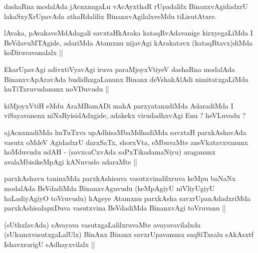 \begin{artha}
dashaRna modalAda jAcnxnagaLu vAcAyxthaR rUpadalilx BinanxvAgidadxrU
lakaSxyXrUpavAda athaRdalilix BinanxvAgilalxveMdu tiLisutAtxre.
\end{artha}

\begin{artha}
lAvaka, pAvakaveMdAdagali savxtaHkAraka kataqRvAdavanige kirxyegaLiMda
I BeVdavuMTAgide, adariMda Atamxnu nijavAgi kArakatavx
(kataqRtavx)diMda koDiruvavanalalx ||
\end{artha}


\begin{artha}
EkarUpavAgi adivxtiVyavAgi iruva paraMjoyxVtiyeV dashaRna modalAda
BinanxvApAravAda budidhxgaLanunx Binanx deVshakAlAdi nimitatxgaLiMda
huTiTxruvudanunx noVDuvudu ||
\end{artha}

\begin{artha}
kiMjoyxVtiH eMdu AraMBamADi mahA parxyatanxdiMda AdaradiMda I
viSayavanenx niNaRyisidAdxgide, adakekx virudadhxvAgi Enu ? heVLuvadu ?
\end{artha}


\begin{artha}
ajAcnxnadiMda huTuTxva upAdhisaMbaMdhadiMda savxtaH parxkAshavAda
vasutx oMdeV AgidadxrU darxSaTx, shorxVta, eMbuvaMte aneVkatavxvanunx
hoMduvudu udAH - (savxcaCxvAda saPxTikadamaNiyu) araganunx
avalaMbisikeMpAgi kANuvudo adaraMte ||
\end{artha}

\begin{artha}
parxkAshavu taninxMda parxkAshisuva vasutxvinalilxruva keMpu baNaNx
modalAda BeVdadiMda BinanxvAguvudu (keMpAgiyU niVliyUgiyU haLadiyAgiyO
toVruvudu) hAgeye Atamxnu parxkAsha savxrUpanAdadxriMda
parxkAshisalapxDuva vasutxvina BeVdadiMda BinanxvAgi toVruvanu ||
\end{artha}


\begin{artha}
(sUthxlavAda) sAvayava vasutxgaLalilxruvaMte avayavavilalxda
  (sUkamxvasutxgaLalUlx) BinAnx Binanx savxrUpavanunx saqSiTxsalu
  sAkAsxtf IshavxrarigU sAdhayxvilalx ||
\end{artha}

